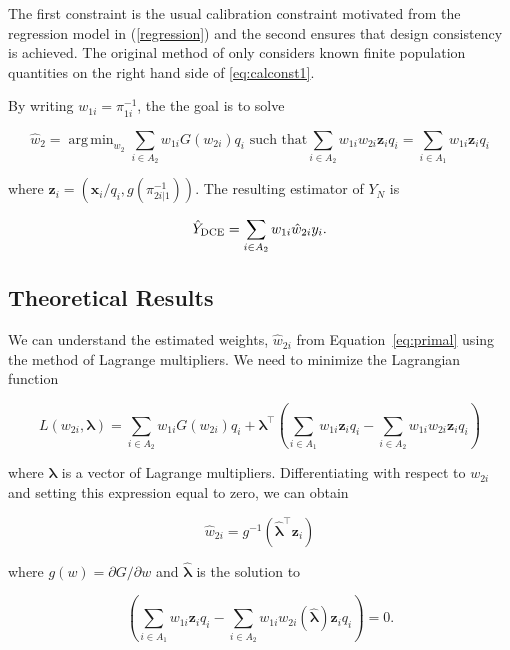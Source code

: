 \documentclass[12pt]{article}
\DeclareMathOperator*{\argmin}{arg\,min}
\renewcommand{\bf}[1]{\mathbf{#1}}
\begin{document}
The first constraint is the usual calibration constraint motivated from the
regression model in (\ref{regression}) and the second
ensures that design consistency is achieved. 
The original method of \cite{kwon2024debiased} only considers known finite
population quantities on the right hand side of \eqref{eq:calconst1}.

By writing $w_{1i} = \pi_{1i}^{-1}$, the the goal is to solve

\begin{equation}\label{eq:primal}
  \hat w_2  = \argmin_{w_{2}} \sum_{i \in A_2} w_{1i} G(w_{2i}) q_i 
  \text{ such that}
  \sum_{i \in A_2} w_{1i} w_{2i} \bf z_i q_i = \sum_{i \in A_1} w_{1i} \bf z_i q_i
\end{equation}

where  $\bf z_i = (\bf x_i / q_i, g(\pi_{2i|1}^{-1}))$. The resulting 
estimator of $Y_N$ is 

\begin{equation}\label{eq:tpest}
\hat Y_{\rm DCE} = \sum_{i \in A_2} w_{1i} \hat w_{2i} y_i.
\end{equation}

\subsection{Theoretical Results}

We can understand the estimated weights, $\hat w_{2i}$ from
Equation~\ref{eq:primal} using the method of Lagrange multipliers. We need to
minimize the Lagrangian function

\begin{equation}\label{eq:legragedc1}
  L(w_{2i}, \bm \lambda) = \sum_{i \in A_2} w_{1i} G(w_{2i}) q_i 
  + \bm \lambda^\top \left( \sum_{i \in A_1} w_{1i} \bf z_i q_i -
    \sum_{i \in A_2} w_{1i} w_{2i} \bf z_i q_i\right)
\end{equation}

where $\bm \lambda$ is a vector of Lagrange multipliers.
Differentiating with respect to $w_{2i}$ and setting this expression equal to
zero, we can obtain 

$$ \hat w_{2i} = g^{-1}(\hat{\bm \lambda}^\top \bf z_i) $$

where $g(w) = \partial G / \partial w$ and 
$\hat{\bm \lambda}$ is the solution to

\begin{equation}\label{eq:lamdc1}
  \left( \sum_{i \in A_1} w_{1i} \bf z_i q_i -
  \sum_{i \in A_2} w_{1i} w_{2i}(\hat{\bm \lambda}) \bf z_i q_i\right) = 0.
\end{equation}
\end{document}
